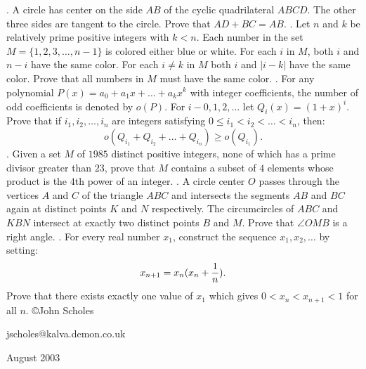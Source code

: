 \nopagenumbers
{}
\vskip 25pt
. A circle has center on the side $AB$ of the cyclic quadrilateral $ABCD$. The other three sides are tangent to the circle. Prove that $AD+BC=AB$.
\vskip 12pt
. Let $n$ and $k$ be relatively prime positive integers with $k<n$. Each number in the set $M=\{1,2,3,\ldots,n-1\}$ is colored either blue or white. For each $i$ in $M$, both $i$ and $n-i$ have the same color. For each $i\ne k$ in $M$ both $i$ and $|i-k|$ have the same color. Prove that all numbers in $M$ must have the same color.
\vskip 12pt
. For any polynomial $P(x)=a_0+a_1x+\ldots+a_kx^k$ with integer coefficients, the number of odd coefficients is denoted by $o(P)$. For $i-0,1,2,\ldots$ let $Q_i(x)=(1+x)^i$. Prove that if $i_1,i_2,\ldots,i_n$ are integers satisfying $0\le i_1<i_2<\ldots<i_n$, then: $$o(Q_{i_1}+Q_{i_2}+\ldots+Q_{i_n})\ge o(Q_{i_1}).$$
\vskip 12pt
. Given a set $M$ of $1985$ distinct positive integers, none of which has a prime divisor greater than $23$, prove that $M$ contains a subset of $4$ elements whose product is the $4$th power of an integer.
\vskip 12pt
. A circle center $O$ passes through the vertices $A$ and $C$ of the triangle $ABC$ and intersects the segments $AB$ and $BC$ again at distinct points $K$ and $N$ respectively. The circumcircles of $ABC$ and $KBN$ intersect at exactly two distinct points $B$ and $M$. Prove that $\angle OMB$ is a right angle.
\vskip 12pt
. For every real number $x_1$, construct the sequence $x_1,x_2,\ldots$ by setting: $$x_{n+1}=x_n(x_n+{1\over n}).$$ Prove that there exists exactly one value of $x_1$ which gives $0<x_n<x_{n+1}<1$ for all $n$.
\vskip 20pt
\noindent \copyright John Scholes

\noindent jscholes@kalva.demon.co.uk

 August 2003

\bye
